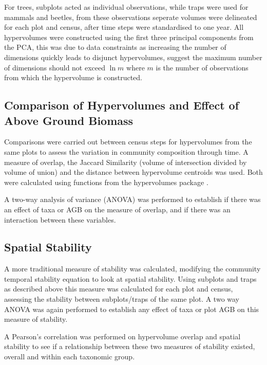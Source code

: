 	For trees, subplots acted as individual observations, while traps were used for mammals and beetles, from these observations seperate volumes were delineated for each plot and census, after time steps were standardised to one year. All hypervolumes were constructed using the first three principal components from the PCA, this was due to data constraints as increasing the number of dimensions quickly leads to disjunct hypervolumes, \cite{Blonder2017b} suggest the maximum number of dimensions should not exceed $\ln m$ where $m$ is the number of observations from which the hypervolume is constructed.

\subsection{Comparison of Hypervolumes and Effect of Above Ground Biomass}

Comparisons were carried out between census steps for hypervolumes from the same plots to assess the variation in community composition through time. A measure of overlap, the Jaccard Similarity (volume of intersection divided by volume of union) and the distance between hypervolume centroids was used. Both were calculated using functions from the hypervolumes package \citep{Blonder2017a}.

A two-way analysis of variance (ANOVA) was performed to establish if there was an effect of taxa or AGB on the measure of overlap, and if there was an interaction between these variables.


\subsection{Spatial Stability}
A more traditional measure of stability was calculated, modifying the community temporal stability equation to look at spatial stability. Using subplots and traps as described above this measure was calculated for each plot and census, assessing the stability between subplots/traps of the same plot. A two way ANOVA was again performed to  establish any effect of taxa or plot AGB on this measure of stability. 

A Pearson's correlation was performed on hypervolume overlap and spatial stability to see if a relationship between these two measures of stability existed, overall and within each taxonomic group. 